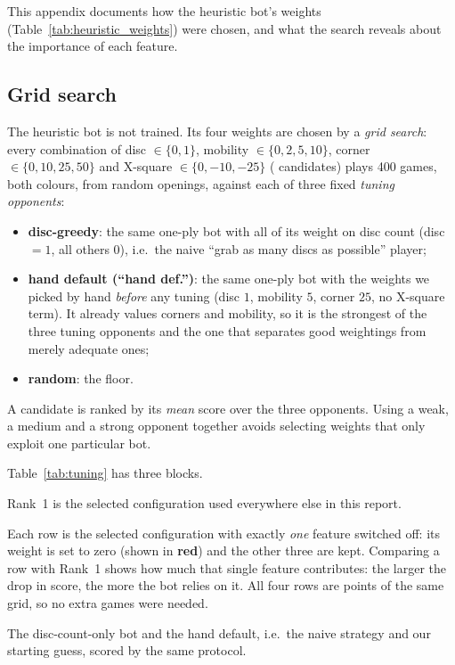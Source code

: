 \documentclass[11pt]{article}
\begin{document}
This appendix documents how the heuristic bot's weights
(Table~\ref{tab:heuristic_weights}) were chosen, and what the search reveals
about the importance of each feature.

\subsection{Grid search}
The heuristic bot is not trained. Its four weights are chosen by a
\emph{grid search}: every combination of disc $\in\{0,1\}$,
mobility $\in\{0,2,5,10\}$, corner $\in\{0,10,25,50\}$ and
X-square $\in\{0,-10,-25\}$ (\NumCandidates{} candidates) plays 400 games,
both colours, from random openings, against each of three fixed
\emph{tuning opponents}:
\begin{itemize}[leftmargin=*]
  \item \textbf{disc-greedy}: the same one-ply bot with all of its weight on
        disc count (disc $=1$, all others $0$), i.e.\ the naive
        ``grab as many discs as possible'' player;
  \item \textbf{hand default (``hand def.'')}: the same one-ply bot with the
        weights we picked by hand \emph{before} any tuning (disc $1$,
        mobility $5$, corner $25$, no X-square term). It already values
        corners and mobility, so it is the strongest of the three tuning
        opponents and the one that separates good weightings from merely
        adequate ones;
  \item \textbf{random}: the floor.
\end{itemize}
A candidate is ranked by its \emph{mean} score over the three opponents. Using a
weak, a medium and a strong opponent together avoids selecting weights that
only exploit one particular bot.

Table~\ref{tab:tuning} has three blocks.
\begin{description}[leftmargin=1.2em,style=nextline]
  \item[Top block: the five best candidates.] Rank~1 is the selected
        configuration used everywhere else in this report.
  \item[Middle block: leave-one-out ablation.] Each row is the selected
        configuration with exactly \emph{one} feature switched off: its weight
        is set to zero (shown in \textcolor{red!75!black}{\textbf{red}}) and the
        other three are kept. Comparing a row with Rank~1 shows how much that
        single feature contributes: the larger the drop in score, the more the
        bot relies on it. All four rows are points of the same grid, so no
        extra games were needed.
  \item[Bottom block: reference points.] The disc-count-only bot and the hand
        default, i.e.\ the naive strategy and our starting guess, scored by the
        same protocol.
\end{description}
\end{document}
